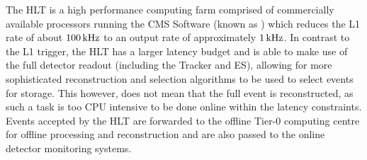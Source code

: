 The HLT is a high performance computing farm comprised of commercially available processors running the CMS Software (known as \CMSSW) which reduces the L1 rate of about $100\text{\,kHz}$ to an output rate of approximately $1\text{\,kHz}$.
In contrast to the L1 trigger, the HLT has a larger latency budget and is able to make use of the full detector readout (including the Tracker and ES), allowing for more sophisticated reconstruction and selection algorithms to be used to select events for storage.
This however, does not mean that the full event is reconstructed, as such a task is too CPU intensive to be done online within the latency constraints.
Events accepted by the HLT are forwarded to the offline Tier-0 computing centre for offline processing and reconstruction and are also passed to the online detector monitoring systems.